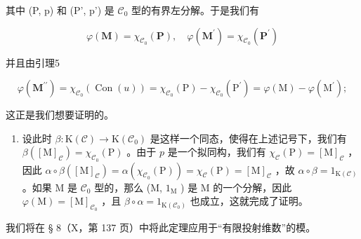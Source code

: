 其中 (P, p) 和 (P', p') 是 \(\mathcal{C}_0\) 型的有界左分解。于是我们有

\[
\varphi (\mathbf {M}) = \chi_ {\mathcal {C} _ {0}} (\mathbf {P}), \quad \varphi (\mathbf {M} ^ {\prime}) = \chi_ {\mathcal {C} _ {0}} (\mathbf {P} ^ {\prime})
\]

并且由引理5

\[
\varphi (\mathbf {M} ^ {\prime \prime}) = \chi_ {\mathcal {C} _ {0}} (\operatorname{Con} (u)) = \chi_ {\mathcal {C} _ {0}} (\mathrm{P}) - \chi_ {\mathcal {C} _ {0}} (\mathrm{P} ^ {\prime}) = \varphi (\mathrm{M}) - \varphi (\mathrm{M} ^ {\prime});
\]

这正是我们想要证明的。

\begin{enumerate}
\def\labelenumi{\alph{enumi})}
\setcounter{enumi}{2}
\tightlist
\item
  设此时 \(\beta: \mathrm{K}(\mathcal{C}) \to \mathrm{K}(\mathcal{C}_0)\) 是这样一个同态，使得在上述记号下，我们有 \(\beta([\mathrm{M}]_{\mathcal{C}}) = \chi_{\mathcal{C}_0}(\mathrm{P})\) 。由于 \(p\) 是一个拟同构，我们有 \(\chi_{\mathcal{C}}(\mathrm{P}) = [\mathrm{M}]_{\mathcal{C}}\) ，因此 \(\alpha \circ \beta([\mathrm{M}]_{\mathcal{C}}) = \alpha(\chi_{\mathcal{C}_0}(\mathrm{P})) = \chi_{\mathcal{C}}(\mathrm{P}) = [\mathrm{M}]_{\mathcal{C}}\) ，故 \(\alpha \circ \beta = 1_{\mathrm{K}(\mathcal{C})}\) 。如果 M 是 \(\mathcal{C}_0\) 型的，那么 (M, \(1_{\mathrm{M}}\) ) 是 M 的一个分解，因此 \(\varphi(\mathrm{M}) = [\mathrm{M}]_{\mathcal{C}_0}\) ，且 \(\beta \circ \alpha = 1_{\mathrm{K}(\mathcal{C}_0)}\) 也成立，这就完成了证明。
\end{enumerate}

我们将在 § 8（X，第 137 页）中将此定理应用于“有限投射维数”的模。

